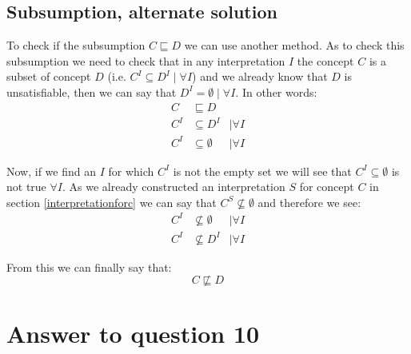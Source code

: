 \documentclass[a4paper,12pt]{article}
\begin{document}
\subsection[Alternate]{Subsumption, alternate solution}
To check if the subsumption $ C \sqsubseteq D $ we can use another method.  As
to check this subsumption we need to check that in any interpretation $I$ the
concept $C$ is a subset of concept $D$ (i.e. $ C^I \subseteq D^I \mid \forall
I$) and we already know that $D$ is unsatisfiable, then we can say that $ D^I =
\emptyset \mid \forall I $.  In other words:
\begin{align*}
C   &\sqsubseteq D\\
C^I &\subseteq D^I        & \mid \forall I\\
C^I &\subseteq \emptyset  & \mid \forall I
\end{align*}

Now, if we find an $I$ for which $C^I$ is not the empty set we will see that $
C^I \subseteq \emptyset $ is not true $\forall I$.  As we already constructed
an interpretation $S$ for concept $C$ in section \ref{interpretationforc} we
can say that $ C^S \nsubseteq \emptyset $ and therefore we see:
\begin{align*}
C^I &\nsubseteq \emptyset  & \mid \forall I\\
C^I &\nsubseteq D^I        & \mid \forall I
\end{align*}

From this we can finally say that:
\begin{equation*}
C \not\sqsubseteq D
\end{equation*}

\section[Question 10]{Answer to question 10}
\end{document}
